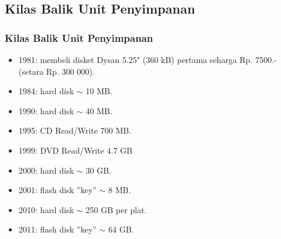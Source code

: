 \documentclass[xcolor=table, notheorems, hyperref={pdfpagelabels=false}]{beamer}
\begin{document}
\begin{frame}[fragile]
\section{Kilas Balik Unit Penyimpanan}
\frametitle{Kilas Balik Unit Penyimpanan}
\begin{itemize}
\item 1981: membeli disket Dysan 5.25" (360 kB) pertama seharga Rp. 7500.- (setara Rp. 300 000).
\item 1984: hard disk $\sim$ 10 MB.
\item 1990: hard disk $\sim$ 40 MB.
\item 1995: CD Read/Write 700 MB.
\item 1999: DVD Read/Write 4.7 GB
\item 2000: hard disk $\sim$ 30 GB.
\item 2001: flash disk ''key'' $\sim$ 8 MB.
\item 2010: hard disk $\sim$ 250 GB per plat.
\item 2011: flash disk ''key'' $\sim$ 64 GB.
\end{itemize}
\end{frame}
\end{document}
